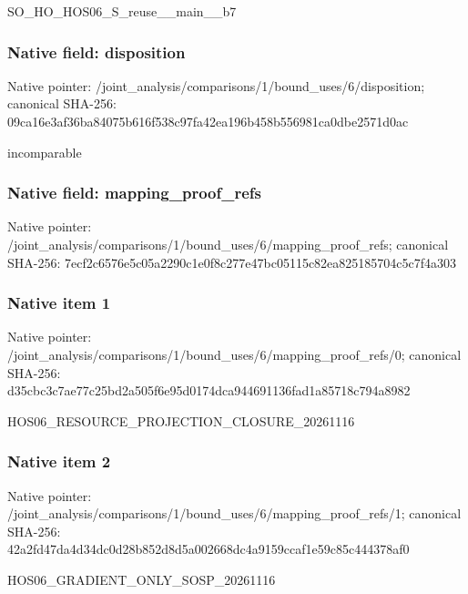 \documentclass[10pt,a4paper]{article}
\begin{document}
\begingroup\raggedright\sloppy SO\_\allowbreak{}HO\_\allowbreak{}HOS06\_\allowbreak{}S\_\allowbreak{}reuse\_\allowbreak{}\_\allowbreak{}main\_\allowbreak{}\_\allowbreak{}b7\par\endgroup

\subsubsection{Native field: disposition}
Native pointer: /joint\_\allowbreak{}analysis/comparisons/1/bound\_\allowbreak{}uses/6/disposition; canonical SHA-256: 09ca16e3af36ba84075b616f538c97fa42ea196b458b556981ca0dbe2571d0ac

\begingroup\raggedright\sloppy incomparable\par\endgroup

\subsubsection{Native field: mapping\_\allowbreak{}proof\_\allowbreak{}refs}
Native pointer: /joint\_\allowbreak{}analysis/comparisons/1/bound\_\allowbreak{}uses/6/mapping\_\allowbreak{}proof\_\allowbreak{}refs; canonical SHA-256: 7ecf2c6576e5c05a2290c1e0f8c277e47bc05115c82ea825185704c5c7f4a303

\subsubsection{Native item 1}
Native pointer: /joint\_\allowbreak{}analysis/comparisons/1/bound\_\allowbreak{}uses/6/mapping\_\allowbreak{}proof\_\allowbreak{}refs/0; canonical SHA-256: d35cbc3c7ae77c25bd2a505f6e95d0174dca944691136fad1a85718c794a8982

\begingroup\raggedright\sloppy HOS06\_\allowbreak{}RESOURCE\_\allowbreak{}PROJECTION\_\allowbreak{}CLOSURE\_\allowbreak{}20261116\par\endgroup

\subsubsection{Native item 2}
Native pointer: /joint\_\allowbreak{}analysis/comparisons/1/bound\_\allowbreak{}uses/6/mapping\_\allowbreak{}proof\_\allowbreak{}refs/1; canonical SHA-256: 42a2fd47da4d34dc0d28b852d8d5a002668dc4a9159ccaf1e59c85c444378af0

\begingroup\raggedright\sloppy HOS06\_\allowbreak{}GRADIENT\_\allowbreak{}ONLY\_\allowbreak{}SOSP\_\allowbreak{}20261116\par\endgroup
\end{document}
